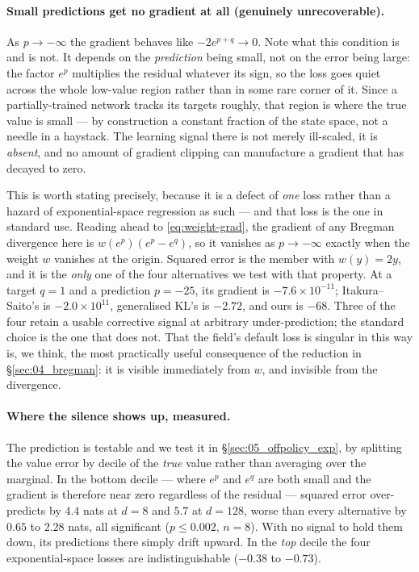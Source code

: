 \paragraph{Small predictions get no gradient at all (genuinely unrecoverable).}
As $p\to-\infty$ the gradient behaves like $-2e^{p+q}\to 0$. Note what this
condition is and is not. It depends on the \emph{prediction} being small, not
on the error being large: the factor $e^{p}$ multiplies the residual whatever
its sign, so the loss goes quiet across the whole low-value region rather than
in some rare corner of it. Since a partially-trained network tracks its targets
roughly, that region is where the true value is small --- by construction a
constant fraction of the state space, not a needle in a haystack. The learning signal there is not
merely ill-scaled, it is \emph{absent}, and no amount of gradient clipping
\citep{pascanu2013difficulty} can manufacture a gradient that has decayed to
zero.

This is worth stating precisely, because it is a defect of \emph{one} loss
rather than a hazard of exponential-space regression as such --- and that loss
is the one in standard use. Reading ahead to \eqref{eq:weight-grad}, the
gradient of any Bregman divergence here is $w(e^{p})(e^{p}-e^{q})$, so it
vanishes as $p\to-\infty$ exactly when the weight $w$ vanishes at the origin.
Squared error is the member with $w(y)=2y$, and it is the \emph{only} one of
the four alternatives we test with that property. At a target $q=1$ and a
prediction $p=-25$, its gradient is $-7.6\times10^{-11}$; Itakura--Saito's is
$-2.0\times10^{11}$, generalised KL's is $-2.72$, and ours is $-68$. Three of
the four retain a usable corrective signal at arbitrary under-prediction; the
standard choice is the one that does not. That the field's default loss is
singular in this way is, we think, the most practically useful consequence of
the reduction in \S\ref{sec:04_bregman}: it is visible immediately from $w$,
and invisible from the divergence.

\paragraph{Where the silence shows up, measured.}
\label{par:strata}
The prediction is testable and we test it in \S\ref{sec:05_offpolicy_exp}, by
splitting the value error by decile of the \emph{true} value rather than
averaging over the marginal. In the bottom decile --- where $e^{p}$ and $e^{q}$
are both small and the gradient is therefore near zero regardless of the
residual --- squared error over-predicts by $4.4$ nats at $d=8$ and $5.7$ at
$d=128$, worse than every alternative by $0.65$ to $2.28$ nats, all significant
($p\le0.002$, $n=8$). With no signal to hold them down, its predictions there
simply drift upward. In the \emph{top} decile the four exponential-space losses
are indistinguishable ($-0.38$ to $-0.73$).


